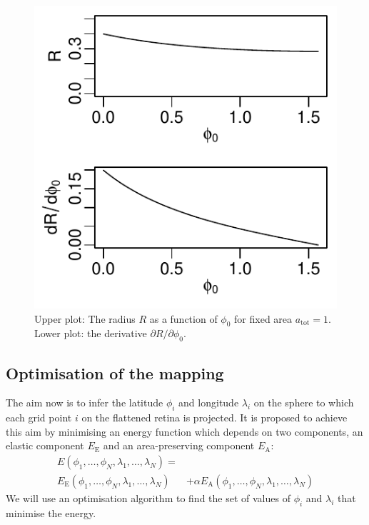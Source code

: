 \documentclass{article}
\begin{document}
\begin{figure}
  \centering
  \includegraphics{R-phi}
  \caption{Upper plot: The radius $R$ as a function of $\phi_0$ for
    fixed area $a_\mathrm{tot}=1$. Lower plot: the derivative
    $\partial R/\partial \phi_0.$}
  \label{retistruct-algorithm:fig:R-phi}
\end{figure}

\subsection{Optimisation of the mapping}
\label{fold-sphere:sec:energy-function}

The aim now is to infer the latitude $\phi_i$ and longitude
$\lambda_i$ on the sphere to which each grid point $i$ on the
flattened retina is projected.  It is proposed to achieve this aim by
minimising an energy function which depends on two components, an
elastic component $E_\mathrm{E}$ and an area-preserving component
$E_\mathrm{A}$:
\begin{equation}
  \begin{split}
  E(\phi_1,\dots,\phi_N,\lambda_1,\dots,\lambda_N) = & \\
  E_\mathrm{E}(\phi_1,\dots,\phi_N,\lambda_1,\dots,\lambda_N) 
  & + \alpha E_\mathrm{A}(\phi_1,\dots,\phi_N,\lambda_1,\dots,\lambda_N) 
  \end{split}
\end{equation}
We will use an optimisation algorithm to find the set of values of
$\phi_i$ and $\lambda_i$ that minimise the energy.
\end{document}
